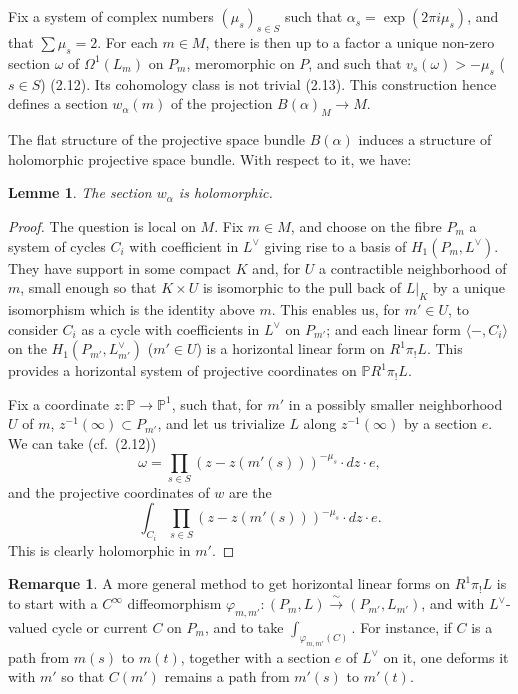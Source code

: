 \documentclass[12pt,a4paper]{article}
\theoremstyle{plain}
\newtheorem{lemma}[theorem]{Lemme}
\theoremstyle{definition}
\newtheorem{remark}[theorem]{Remarque}
\theoremstyle{remark}
\newcommand{\PP}{\mathbb{P}}
\numberwithin{equation}{section}
\providecommand{\PP}{\mathbb{P}}
\begin{document}
\subsection{}
Fix a system of complex numbers $(\mu_s)_{s \in S}$ such that $\alpha_s = \exp(2\pi i \mu_s)$, and that $\sum \mu_s = 2$. For each $m \in M$, there is then up to a factor a unique non-zero section $\omega$ of $\Omega^1(L_m)$ on $P_m$, meromorphic on $P$, and such that $v_s(\omega) > -\mu_s$ ($s \in S$) (2.12). Its cohomology class is not trivial (2.13). This construction hence defines a section $w_\alpha(m)$ of the projection $B(\alpha)_M \to M$.

The flat structure of the projective space bundle $B(\alpha)$ induces a structure of holomorphic projective space bundle. With respect to it, we have:

\begin{lemma}\label{lem:3.5}
The section $w_\alpha$ is holomorphic.
\end{lemma}

\begin{proof}
The question is local on $M$. Fix $m \in M$, and choose on the fibre $P_m$ a system of cycles $C_i$ with coefficient in $L^\vee$ giving rise to a basis of $H_1(P_m, L^\vee)$. They have support in some compact $K$ and, for $U$ a contractible neighborhood of $m$, small enough so that $K \times U$ is isomorphic to the pull back of $L|_K$ by a unique isomorphism which is the identity above $m$. This enables us, for $m' \in U$, to consider $C_i$ as a cycle with coefficients in $L^\vee$ on $P_{m'}$; and each linear form $\langle -, C_i \rangle$ on the $H_1(P_{m'}, L_{m'}^\vee)$ ($m' \in U$) is a horizontal linear form on $R^1\pi_!L$. This provides a horizontal system of projective coordinates on $\PP R^1\pi_!L$.

Fix a coordinate $z: \PP \to \PP^1$, such that, for $m'$ in a possibly smaller neighborhood $U$ of $m$, $z^{-1}(\infty) \subset P_{m'}$, and let us trivialize $L$ along $z^{-1}(\infty)$ by a section $e$. We can take (cf.\ (2.12))
\[
\omega = \prod_{s \in S} (z - z(m'(s)))^{-\mu_s} \cdot dz \cdot e,
\]
and the projective coordinates of $w$ are the
\[
\int_{C_i} \prod_{s \in S} (z - z(m'(s)))^{-\mu_s} \cdot dz \cdot e.
\]
This is clearly holomorphic in $m'$.
\end{proof}

\begin{remark}\label{rmk:3.6}
A more general method to get horizontal linear forms on $R^1\pi_!L$ is to start with a $C^\infty$ diffeomorphism $\varphi_{m,m'}: (P_m, L) \xrightarrow{\sim} (P_{m'}, L_{m'})$, and with $L^\vee$-valued cycle or current $C$ on $P_m$, and to take $\int_{\varphi_{m,m'}(C)}$. For instance, if $C$ is a path from $m(s)$ to $m(t)$, together with a section $e$ of $L^\vee$ on it, one deforms it with $m'$ so that $C(m')$ remains a path from $m'(s)$ to $m'(t)$.
\end{remark}
\end{document}

